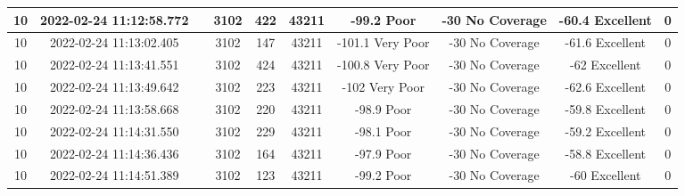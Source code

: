 \begin{longtable*}{|c|c|c|c|c|c|c|c|c|c|}
10&2022-02-24 11:12:58.772&&3102&422&43211& -99.2     Poor        & -30       No Coverage & -60.4     Excellent   & 0\\\hline
{}10&2022-02-24 11:13:02.405&&3102&147&43211& -101.1    Very Poor   & -30       No Coverage & -61.6     Excellent   & 0\\\hline
{}10&2022-02-24 11:13:41.551&&3102&424&43211& -100.8    Very Poor   & -30       No Coverage & -62       Excellent   & 0\\\hline
{}10&2022-02-24 11:13:49.642&&3102&223&43211& -102      Very Poor   & -30       No Coverage & -62.6     Excellent   & 0\\\hline
{}10&2022-02-24 11:13:58.668&&3102&220&43211& -98.9     Poor        & -30       No Coverage & -59.8     Excellent   & 0\\\hline
{}10&2022-02-24 11:14:31.550&&3102&229&43211& -98.1     Poor        & -30       No Coverage & -59.2     Excellent   & 0\\\hline
{}10&2022-02-24 11:14:36.436&&3102&164&43211& -97.9     Poor        & -30       No Coverage & -58.8     Excellent   & 0\\\hline
{}10&2022-02-24 11:14:51.389&&3102&123&43211& -99.2     Poor        & -30       No Coverage & -60       Excellent   & 0\\\hline

\end{longtable*}
